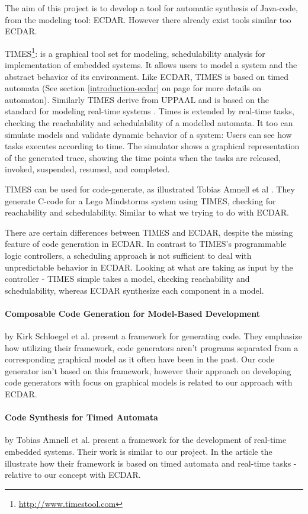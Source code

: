 The aim of this project is to develop a tool for automatic synthesis of Java-code, from the modeling tool: ECDAR. However there already exist tools similar too ECDAR.

TIMES\footnote{\url{http://www.timestool.com}}: is a graphical tool set for modeling, schedulability analysis for implementation of embedded systems. It allows users to model a system and the abstract behavior of its environment. 
Like ECDAR, TIMES is based on timed automata (See section \ref{introduction-ecdar} on page \pageref{introduction-ecdar} for more details on automaton). Similarly TIMES derive from UPPAAL and is based on the standard for modeling real-time systems \cite{Alur1994:183}.
Times is extended by real-time tasks, checking the reachability and schedulability of a modelled automata. It too can simulate models and validate dynamic behavior of a system: Users can see how tasks executes according to time. The simulator shows a graphical representation of the generated trace, showing the time points when the tasks are released, invoked, suspended, resumed, and completed.

TIMES can be used for code-generate, as illustrated Tobias Amnell et al \cite{Amnell:2002:CST:779110.779112}. They generate C-code for a Lego Mindstorms system using TIMES, checking for reachability and schedulability. Similar to what we trying to do with ECDAR. 

There are certain differences between TIMES and ECDAR, despite the missing feature of code generation in ECDAR. In contrast to TIMES's programmable logic controllers, a scheduling approach is not sufficient to deal with unpredictable behavior in ECDAR.
Looking at what are taking as input by the controller - TIMES simple takes a model, checking reachability and schedulability, whereas ECDAR synthesize each component in a model.



\paragraph{Composable Code Generation for Model-Based Development}
by Kirk Schloegel et al. present a framework for generating
code\cite{composable-code-generation}. They emphasize how utilizing their
framework, code generators aren't programs separated from a corresponding
graphical model as it often have been in the past. Our code generator isn't
based on this framework, however their approach on developing code generators
with focus on graphical models is related to our approach with ECDAR.

\paragraph{Code Synthesis for Timed Automata}
by Tobias Amnell et al. present a framework for the development of real-time
embedded systems\cite{Amnell:2002:CST:779110.779112}. Their work is similar to
our project. In the article the illustrate how their framework is based on timed
automata and real-time tasks - relative to our concept with ECDAR.

